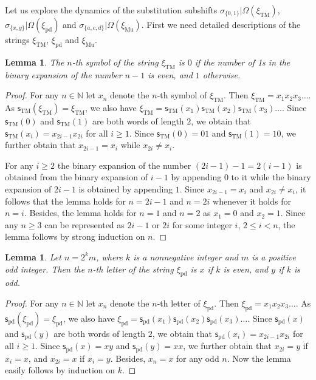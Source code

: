\documentclass[12pt]{article}
\newtheorem{lemma}[theorem]{Lemma}
\theoremstyle{definition}
\def\bN{\mathbb{N}}
\def\si{\sigma}
\def\Om{\Omega}
\def\subst{\mathsf{s}}
\def\TM{\subst_{\mathrm{TM}}}
\def\pd{\subst_{\mathrm{pd}}}
\def\xiTM{\xi_{\mathrm{TM}}}
\def\xipd{\xi_{\mathrm{pd}}}
\def\xiGE{\xi_{\mathrm{Mu}}}
\begin{document}
Let us explore the dynamics of the substitution subshifts 
$\si_{\{0,1\}}|\Om(\xiTM)$, $\si_{\{x,y\}}|\Om(\xipd)$ and 
$\si_{\{a,c,d\}}|\Om(\xiGE)$.  First we need detailed descriptions of the 
strings $\xiTM$, $\xipd$ and $\xiGE$.

\begin{lemma}\label{xi-TM}
The $n$-th symbol of the string $\xiTM$ is $0$ if the number of 1s in the 
binary expansion of the number $n-1$ is even, and $1$ otherwise.
\end{lemma}

\begin{proof}
For any $n\in\bN$ let $x_n$ denote the $n$-th symbol of $\xiTM$.  Then 
$\xiTM=x_1x_2x_3\ldots$.  As $\TM(\xiTM)=\xiTM$, we also have 
$\xiTM=\TM(x_1)\TM(x_2)\TM(x_3)\ldots$.  Since $\TM(0)$ and $\TM(1)$ are 
both words of length $2$, we obtain that $\TM(x_i)=x_{2i-1}x_{2i}$ for all 
$i\ge1$.  Since $\TM(0)=01$ and $\TM(1)=10$, we further obtain that 
$x_{2i-1}=x_i$ while $x_{2i}\ne x_i$.

For any $i\ge2$ the binary expansion of the number $(2i-1)-1=2(i-1)$ is 
obtained from the binary expansion of $i-1$ by appending $0$ to it while
the binary expansion of $2i-1$ is obtained by appending $1$.  Since 
$x_{2i-1}=x_i$ and $x_{2i}\ne x_i$, it follows that the lemma holds for 
$n=2i-1$ and $n=2i$ whenever it holds for $n=i$.  Besides, the lemma holds 
for $n=1$ and $n=2$ as $x_1=0$ and $x_2=1$.  Since any $n\ge3$ can be 
represented as $2i-1$ or $2i$ for some integer $i$, $2\le i<n$, the lemma 
follows by strong induction on $n$.
\end{proof}

\begin{lemma}\label{xi-pd}
Let $n=2^km$, where $k$ is a nonnegative integer and $m$ is a positive odd 
integer.  Then the $n$-th letter of the string $\xipd$ is $x$ if $k$ is 
even, and $y$ if $k$ is odd.
\end{lemma}

\begin{proof}
For any $n\in\bN$ let $x_n$ denote the $n$-th letter of $\xipd$.  Then 
$\xipd=x_1x_2x_3\ldots$.  As $\pd(\xipd)=\xipd$, we also have 
$\xipd=\pd(x_1)\pd(x_2)\pd(x_3)\ldots$.  Since $\pd(x)$ and $\pd(y)$ are 
both words of length $2$, we obtain that $\pd(x_i)=x_{2i-1}x_{2i}$ for all 
$i\ge1$.  Since $\pd(x)=xy$ and $\pd(y)=xx$, we further obtain that 
$x_{2i}=y$ if $x_i=x$, and $x_{2i}=x$ if $x_i=y$.  Besides, $x_n=x$ for any 
odd $n$.  Now the lemma easily follows by induction on $k$.
\end{proof}
\end{document}
